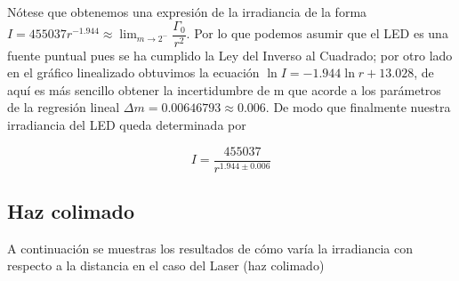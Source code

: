 Nótese que obtenemos una expresión de la irradiancia de la forma $I = 455037r^{-1.944} \approx \lim_{m\rightarrow2^-} \dfrac{\Gamma_0}{r^2}$. Por lo que podemos asumir que el LED es una fuente puntual pues se ha cumplido la Ley del Inverso al Cuadrado; por otro lado en el gráfico linealizado obtuvimos la ecuación $\ln I = -1.944 \ln r + 13.028$, de aquí es más sencillo obtener la incertidumbre de m que acorde a los parámetros de la regresión lineal $\Delta m = 0.00646793 \approx 0.006
$. De modo que finalmente nuestra irradiancia del LED queda determinada por

\begin{mdframed}
    \begin{equation}
        I = \frac{455037}{r^{1.944\pm0.006}}
    \end{equation}
\end{mdframed}

\subsection{Haz colimado}

A continuación se muestras los resultados de cómo varía la irradiancia con respecto a la distancia en el caso del Laser (haz colimado)\\

